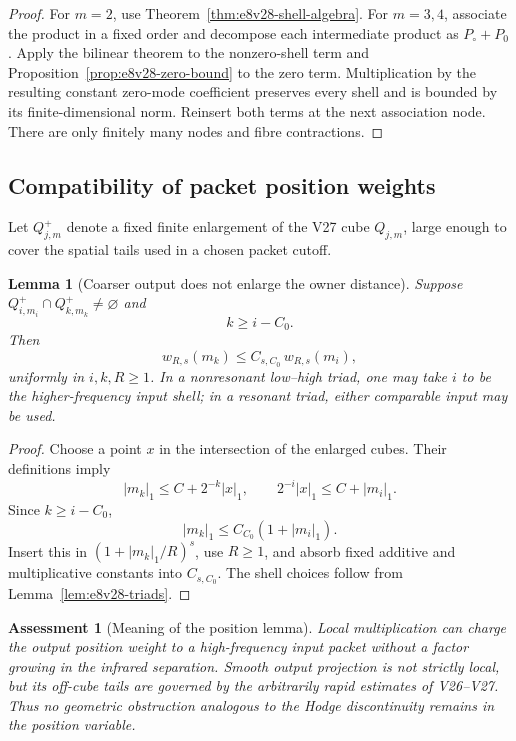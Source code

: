 \documentclass[11pt,oneside]{book}
\newtheorem{lemma}[theorem]{Lemma}
\newtheorem{assessment}[theorem]{Assessment}
\theoremstyle{definition}
\theoremstyle{remark}
\begin{document}
\begin{proof}
For \(m=2\), use Theorem~\ref{thm:e8v28-shell-algebra}.  For
\(m=3,4\), associate the product in a fixed order and decompose each
intermediate product as \(P_\circ+P_0\).  Apply the bilinear theorem
to the nonzero-shell term and
Proposition~\ref{prop:e8v28-zero-bound} to the zero term.
Multiplication by the resulting constant zero-mode coefficient
preserves every shell and is bounded by its finite-dimensional norm.
Reinsert both terms at the next association node.  There are only
finitely many nodes and fibre contractions.
\end{proof}

\subsection{Compatibility of packet position weights}

Let \(Q_{j,m}^+\) denote a fixed finite enlargement of the V27 cube
\(Q_{j,m}\), large enough to cover the spatial tails used in a chosen
packet cutoff.

\begin{lemma}[Coarser output does not enlarge the owner distance]
\label{lem:e8v28-position-transfer}
Suppose \(Q_{i,m_i}^+\cap Q_{k,m_k}^+\ne\varnothing\) and
\[
                              k\geq i-C_0.                        \tag{28.22}
\]
Then
\[
\boxed{\qquad
 w_{R,s}(m_k)\leq
 C_{s,C_0}\,w_{R,s}(m_i),
\qquad}                                                           \tag{28.23}
\]
uniformly in \(i,k,R\geq1\).  In a nonresonant low--high triad, one
may take \(i\) to be the higher-frequency input shell; in a resonant
triad, either comparable input may be used.
\end{lemma}

\begin{proof}
Choose a point \(x\) in the intersection of the enlarged cubes.
Their definitions imply
\[
 |m_k|_1\leq
 C+2^{-k}|x|_1,\qquad
 2^{-i}|x|_1\leq C+|m_i|_1.                                     \tag{28.24}
\]
Since \(k\geq i-C_0\),
\[
 |m_k|_1\leq C_{C_0}(1+|m_i|_1).
\]
Insert this in
\((1+|m_k|_1/R)^s\), use \(R\geq1\), and absorb fixed additive and
multiplicative constants into \(C_{s,C_0}\).
The shell choices follow from
Lemma~\ref{lem:e8v28-triads}.
\end{proof}

\begin{assessment}[Meaning of the position lemma]
\label{ass:e8v28-position}
Local multiplication can charge the output position weight to a
high-frequency input packet without a factor growing in the infrared
separation.  Smooth output projection is not strictly local, but its
off-cube tails are governed by the arbitrarily rapid estimates of
V26--V27.  Thus no geometric obstruction analogous to the Hodge
discontinuity remains in the position variable.
\end{assessment}
\end{document}
